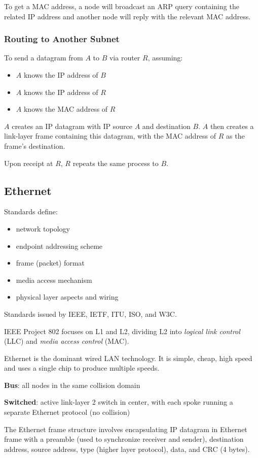 \documentclass[11pt]{article}
\begin{document}
To get a MAC address, a node will broadcast an ARP query containing the related IP address
and another node will reply with the relevant MAC address.
\subsubsection{Routing to Another Subnet}
\label{sec:orgbd6d423}
To send a datagram from \(A\) to \(B\) via router \(R\), assuming:
\begin{itemize}
\item \(A\) knows the IP address of \(B\)
\item \(A\) knows the IP address of \(R\)
\item \(A\) knows the MAC address of \(R\)
\end{itemize}

\(A\) creates an IP datagram with IP source \(A\) and destination \(B\).
\(A\) then creates a link-layer frame containing this datagram, with the MAC address of \(R\) as the
frame's destination.

Upon receipt at \(R\), \(R\) repeats the same process to \(B\).
\subsection{Ethernet}
\label{sec:org5a2cb14}
Standards define:
\begin{itemize}
\item network topology
\item endpoint addressing scheme
\item frame (packet) format
\item media access mechanism
\item physical layer aspects and wiring
\end{itemize}

Standards issued by IEEE, IETF, ITU, ISO, and W3C.

IEEE Project 802 focuses on L1 and L2, dividing L2 into \emph{logical link control} (LLC) and
\emph{media access control} (MAC).

Ethernet is the dominant wired LAN technology. It is simple, cheap, high speed and uses a single
chip to produce multiple speeds.

\textbf{Bus}: all nodes in the same collision domain

\textbf{Switched}: active link-layer 2 switch in center, with each spoke running a separate Ethernet protocol
(no collision)

The Ethernet frame structure involves encapsulating IP datagram in Ethernet frame with a preamble
(used to synchronize receiver and sender), destination address, source address, type (higher layer
protocol), data, and CRC (4 bytes).
\end{document}
